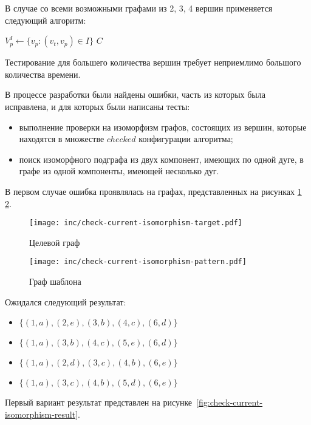 В случае со всеми возможными графами из 2, 3, 4 вершин применяется следующий алгоритм:

\begin{algorithmic}
                \State {}
                \State $V^I_p \gets \{ v_p : (v_t, v_p) \in I \}$
                \State {}
            \EndFor
        \EndFor
    \EndFor
\EndFor
\State \Return $C$
\end{algorithmic}

Тестирование для большего количества вершин требует неприемлимо большого
количества времени.

В процессе разработки были найдены ошибки, часть из которых была исправлена,
и для которых были написаны тесты:
\begin{itemize}
\item выполнение проверки на изоморфизм графов, состоящих из вершин,
которые находятся в множестве $checked$ конфигурации алгоритма;
\item поиск изоморфного подграфа из двух компонент, имеющих по одной дуге,
в графе из одной компоненты, имеющей несколько дуг.
\end{itemize}

В первом случае ошибка проявлялась на графах, представленных на
рисунках \ref{fig:check-current-isomorphism-target}
\ref{fig:check-current-isomorphism-pattern}.

\begin{figure}[!ht]
\centering
\texttt{[image: inc/check-current-isomorphism-target.pdf]}
\caption{Целевой граф}
\label{fig:check-current-isomorphism-target}
\end{figure}

\begin{figure}[!ht]
\centering
\texttt{[image: inc/check-current-isomorphism-pattern.pdf]}
\caption{Граф шаблона}
\label{fig:check-current-isomorphism-pattern}
\end{figure}

Ожидался следующий результат:
\begin{itemize}
\item $\{ (1, a), (2, e), (3, b), (4, c), (6, d) \}$
\item $\{ (1, a), (3, b), (4, c), (5, e), (6, d) \}$
\item $\{ (1, a), (2, d), (3, c), (4, b), (6, e) \}$
\item $\{ (1, a), (3, c), (4, b), (5, d), (6, e) \}$
\end{itemize}
Первый вариант результат представлен на
рисунке~\ref{fig:check-current-isomorphism-result}.

